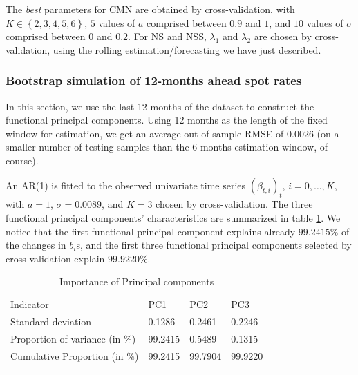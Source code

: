 \medskip

The \textit{best} parameters for CMN are obtained by cross-validation, with $K \in \left\lbrace 2, 3, 4, 5, 6\right\rbrace$, $5$ values of $a$ comprised between $0.9$ and $1$, and $10$ values of $\sigma$ comprised between $0$ and $0.2$. For NS and NSS, $\lambda_1$ and $\lambda_2$ are chosen by cross-validation, using the rolling estimation/forecasting we have just described.
\subsubsection{Bootstrap simulation of 12-months ahead spot rates}

In this section, we use the last 12 months of the dataset to construct the functional principal components. Using 12 months as the length of the fixed window for estimation, we get an average out-of-sample RMSE of $0.0026$ (on a smaller number of testing samples than the 6 months estimation window, of course).

\medskip

An AR(1) is fitted to the observed univariate time series $(\beta_{t, i})_t$, $i = 0, \ldots, K$, with $a = 1$, $\sigma = 0.0089$, and $K = 3$ chosen by cross-validation. The three functional principal components' characteristics are summarized in table \ref{tab:boot1}. We notice that the first functional principal component explains already $99.2415\%$ of the changes in $b_i$s, and the first three functional principal components selected by cross-validation explain $99.9220\%$.

\begin{table}
\begin{center}
\caption{Importance of Principal components}
\label{tab:boot1}       %
\begin{tabular}{llll}
\hline\noalign{\smallskip}
Indicator & PC1 & PC2 & PC3 \\
\noalign{\smallskip}\hline\noalign{\smallskip}
  Standard deviation & 0.1286 & 0.2461 & 0.2246\\
  Proportion of variance (in $\%$) & 99.2415 & 0.5489 & 0.1315\\
  Cumulative Proportion (in $\%$) & 99.2415 & 99.7904 & 99.9220\\
\noalign{\smallskip}\hline
\end{tabular}
\end{center}
\end{table}

